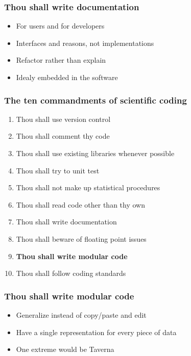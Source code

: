 \documentclass[slidestop]{beamer}
\begin{document}
\begin{frame}
  \frametitle{Thou shall write documentation}
  \begin{itemize}
    \item For users and for developers
    \item Interfaces and reasons, not implementations
    \item Refactor rather than explain
    \item Idealy embedded in the software
  \end{itemize}
\end{frame}

\begin{frame}
  \frametitle{The ten commandments of scientific coding}
  \begin{enumerate}
    \item Thou shall use version control
    \item Thou shall comment thy code
    \item Thou shall use existing libraries whenever possible
    \item Thou shall try to unit test
    \item Thou shall not make up statistical procedures
    \item Thou shall read code other than thy own
    \item Thou shall write documentation
    \item Thou shall beware of floating point issues
    \item {\bf Thou shall write modular code}
    \item Thou shall follow coding standards
  \end{enumerate}
\end{frame}

\begin{frame}
  \frametitle{Thou shall write modular code}
  \begin{itemize}
    \item Generalize instead of copy/paste and edit
    \item Have a single representation for every piece of data
    \item One extreme would be Taverna
  \end{itemize}
\end{frame}
\end{document}
